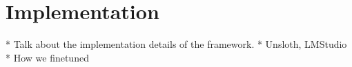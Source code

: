 \section{Implementation}


* Talk about the implementation details of the framework. 
* Unsloth, LMStudio 
* How we finetuned
